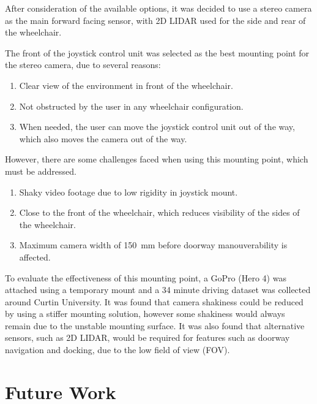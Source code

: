 \documentclass[12pt]{article}
\begin{document}
After consideration of the available options, it was decided to use a stereo camera as the main
forward facing sensor, with 2D LIDAR used for the side and rear of the wheelchair.

The front of the joystick control unit was selected as the best mounting point for the
stereo camera, due to several reasons:
\begin{enumerate}
    \item Clear view of the environment in front of the wheelchair.
    \item Not obstructed by the user in any wheelchair configuration.
    \item When needed, the user can move the joystick control unit out of the way,
            which also moves the camera out of the way.
\end{enumerate}
However, there are some challenges faced when using this mounting point, which must be addressed.
\begin{enumerate}
    \item Shaky video footage due to low rigidity in joystick mount.
    \item Close to the front of the wheelchair, which reduces visibility of the sides of the wheelchair.
    \item Maximum camera width of \SI{150}{\milli\metre} before doorway manouverability is affected.
\end{enumerate}

To evaluate the effectiveness of this mounting point, a GoPro (Hero 4) was attached
using a temporary mount and a 34 minute driving dataset was collected around Curtin University.
It was found that camera shakiness could be reduced by using a stiffer mounting solution,
however some shakiness would always remain due to the unstable mounting surface.
It was also found that alternative sensors, such as 2D LIDAR, would be required for features such as doorway
navigation and docking, due to the low field of view (FOV).

\pagebreak

\section{Future Work}
\pagebreak

\printbibliography[heading=bibnumbered]
\end{document}
